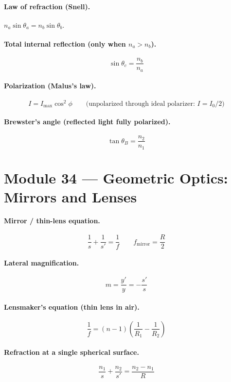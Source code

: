 \documentclass[11pt]{article}
\begin{document}
\paragraph{Law of refraction (Snell).} $n_a\sin\theta_a = n_b\sin\theta_b$.

\paragraph{Total internal reflection (only when $n_a > n_b$).}
\[
\sin\theta_c = \frac{n_b}{n_a}
\]

\paragraph{Polarization (Malus's law).}
\[
I = I_{\max}\cos^2\phi
\qquad\text{(unpolarized through ideal polarizer: }I = I_0/2)
\]

\paragraph{Brewster's angle (reflected light fully polarized).}
\[
\tan\theta_B = \frac{n_2}{n_1}
\]

\section*{Module 34 --- Geometric Optics: Mirrors and Lenses}

\paragraph{Mirror / thin-lens equation.}
\[
\frac{1}{s} + \frac{1}{s'} = \frac{1}{f}
\qquad
f_{\text{mirror}} = \frac{R}{2}
\]

\paragraph{Lateral magnification.}
\[
m = \frac{y'}{y} = -\frac{s'}{s}
\]

\paragraph{Lensmaker's equation (thin lens in air).}
\[
\frac{1}{f} = (n - 1)\!\left(\frac{1}{R_1} - \frac{1}{R_2}\right)
\]

\paragraph{Refraction at a single spherical surface.}
\[
\frac{n_1}{s} + \frac{n_2}{s'} = \frac{n_2 - n_1}{R}
\]
\end{document}
